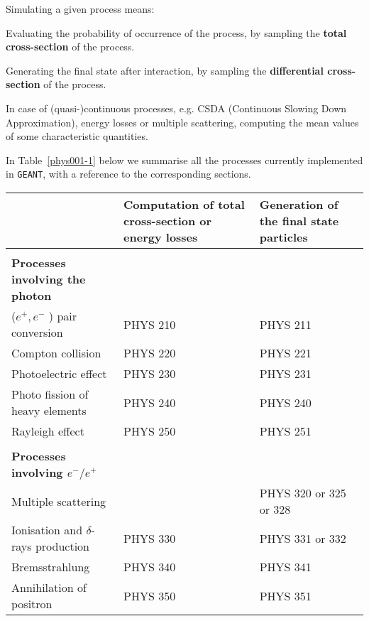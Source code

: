 Simulating a given process means:
\begin{UL}
\item
Evaluating the probability of occurrence of the process, by sampling the
{\bf total cross-section} of the process.
\item
Generating the final state after interaction, by sampling the
{\bf differential cross-section} of the process.
\item
In case of (quasi-)continuous processes, e.g. CSDA
(Continuous Slowing Down Approximation), energy losses or multiple 
scattering, computing the mean values of some characteristic quantities.
\end{UL}
In Table~\ref{phys001-1} below we summarise all the processes currently 
implemented in {\tt GEANT}, with a reference to the corresponding sections.
\begin{table}[hbt]
\begin{center}
\begin{tabular}{|l|l|l|}
\hline
& \parbox{5cm}{Computation of total cross-section or energy losses}
& \parbox{5cm}{Generation of the final state particles} \\
\hline
                                            &              &           \\
{\bf  Processes involving the photon }      &              &           \\
($e^+,e^-$ ) pair conversion                & PHYS 210     & PHYS  211 \\
Compton collision                           & PHYS 220     & PHYS  221 \\
Photoelectric effect                        & PHYS 230     & PHYS  231 \\
Photo fission of heavy elements             & PHYS 240     & PHYS  240 \\
Rayleigh effect                             & PHYS 250     & PHYS  251 \\
                                            &              &           \\
{\bf Processes involving $e^-/e^+ $ }       &              &           \\
Multiple scattering                         &              & PHYS 320
or 325 or 328\\
Ionisation and $\delta$-rays production     & PHYS 330     & PHYS 331
or 332 \\
Bremsstrahlung                              & PHYS 340      & PHYS 341 \\
Annihilation of positron                    & PHYS 350      & PHYS 351 \\

\end{tabular}
\end{center}
\end{table}
